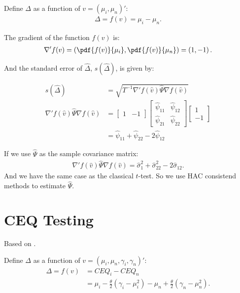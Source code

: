 \documentclass[12pt,oneside,a4paper]{article}
\begin{document}
Define $\Delta$ as a function of $v = (\mu_{i}, \mu_{n})'$:
\begin{align*}
\Delta = f(v) = \mu_{i} - \mu_{n}.
\end{align*}

The gradient of the function $f(v)$ is:
\begin{align}
\nabla' f(v) =
\left( 
\pdf{f(v)}{\mu_{i}},
\pdf{f(v)}{\mu_{n}}
\right) = \left( 1, -1 \right).
\end{align}

And the standard error of $\hat{\Delta}$, $s(\hat{\Delta})$, is given by:

\begin{align*}
s(\hat{\Delta}) &= \sqrt{T^{-1} \nabla'f(\hat{v}) \hat{\Psi} \nabla f(\hat{v})} 
\\
\nabla'f(\hat{v}) \hat{\Psi} \nabla f(\hat{v}) &=
\begin{bmatrix} 1 & -1 \end{bmatrix}
\begin{bmatrix}
\hat{\psi}_{11} &  \hat{\psi}_{12}
\\            
\hat{\psi}_{21} &  \hat{\psi}_{22}
\end{bmatrix}
\begin{bmatrix} 1 \\  -1 \end{bmatrix}
\\
&= \hat{\psi}_{11} + \hat{\psi}_{22} -2\hat{\psi}_{12}
\end{align*}

If we use $\hat{\Psi}$ as the sample covariance matrix:
\begin{align*}
\nabla'f(\hat{v}) \hat{\Psi} \nabla f(\hat{v})= \hat{\sigma}_{1}^2 + \hat{\sigma}_{22}^{2} -2\hat{\sigma}_{12}.
\end{align*}
And we have the same case as the classical $t$-test.
So we use HAC consistend methods to estimate $\hat{\Psi}$.

\clearpage
\section{CEQ Testing}

Based on \cite{lw2008-sr, lw2011-var}.

Define $\Delta$ as a function of $v = (\mu_{i}, \mu_{n}, \gamma_{i}, \gamma_{n})'$:
\begin{align*}
\Delta = f(v) &= CEQ_{i} - CEQ_{n} 
\\ &= \mu_{i} - \frac{\theta}{2}(\gamma_{i} - \mu^2_{i}) -
\mu_{n} + \frac{\theta}{2}(\gamma_{n} - \mu^2_{n}).
\end{align*}
\end{document}
